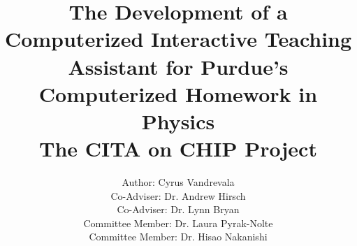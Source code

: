 \documentclass[11pt,twoside]{book}
\title{The Development of a Computerized Interactive Teaching Assistant for Purdue's Computerized Homework in Physics\\[0.2in]The CITA on CHIP Project}
\author{Author: Cyrus Vandrevala\\[0.2in]
Co-Adviser: Dr. Andrew Hirsch\\
Co-Adviser: Dr. Lynn Bryan\\
Committee Member: Dr. Laura Pyrak-Nolte\\
Committee Member: Dr. Hisao Nakanishi}
\begin{document}
\frontmatter
\maketitle
\tableofcontents
\listoffigures
\listoftables




\mainmatter





\appendix







\backmatter


\printglossaries
\printindex
\end{document}
